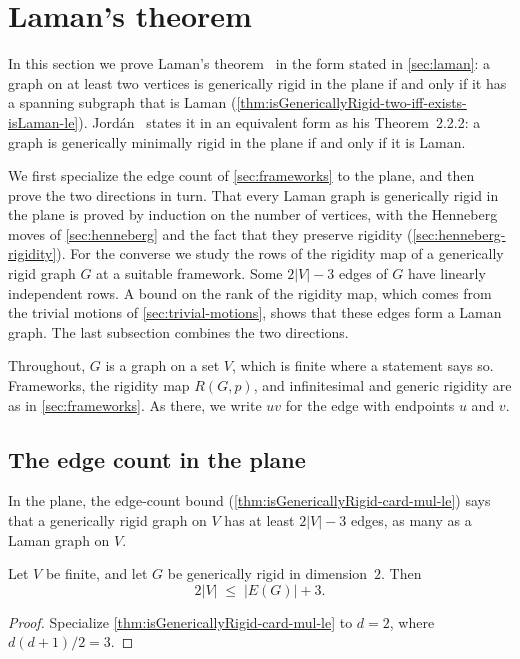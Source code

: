 \section{Laman's theorem}
\label{sec:laman-theorem}

In this section we prove Laman's
theorem~\cite{pollaczekGeiringer1927,laman1970} in the form
stated in \cref{sec:laman}: a graph on at least two vertices is
generically rigid in the plane if and only if it has a spanning
subgraph that is Laman
(\cref{thm:isGenericallyRigid-two-iff-exists-isLaman-le}).
Jord\'an~\cite{jordan2016} states it in an equivalent form as his
Theorem~2.2.2: a graph is generically minimally rigid in the plane if
and only if it is Laman.

We first specialize the edge count of \cref{sec:frameworks} to the
plane, and then prove the two directions in turn. That every Laman
graph is generically rigid in the plane is proved by induction on the
number of vertices, with the Henneberg moves of \cref{sec:henneberg}
and the fact that they preserve rigidity
(\cref{sec:henneberg-rigidity}). For the converse we study the rows of
the rigidity map of a generically rigid graph $G$ at a suitable
framework. Some $2|V| - 3$ edges of $G$ have linearly independent
rows. A bound on the rank of the rigidity map, which comes from the
trivial motions of \cref{sec:trivial-motions}, shows that these edges
form a Laman graph. The last subsection combines the two directions.

Throughout, $G$ is a graph on a set $V$, which is finite where a
statement says so. Frameworks, the rigidity map $R(G, p)$, and
infinitesimal and generic rigidity are as in \cref{sec:frameworks}. As
there, we write $uv$ for the edge with endpoints $u$ and $v$.

\subsection{The edge count in the plane}

In the plane, the edge-count bound
(\cref{thm:isGenericallyRigid-card-mul-le}) says that a generically
rigid graph on $V$ has at least $2|V| - 3$ edges, as many as a Laman
graph on $V$.

\begin{lemma}
  \label{lem:isGenericallyRigid-card-mul-le-two}
  \leanok
  Let $V$ be finite, and let $G$ be generically rigid in
  dimension~$2$. Then
  \[
    2 |V| \;\le\; |E(G)| + 3.
  \]
\end{lemma}
\begin{proof}
  \leanok
  Specialize \cref{thm:isGenericallyRigid-card-mul-le} to $d = 2$,
  where $d(d+1)/2 = 3$.
\end{proof}

